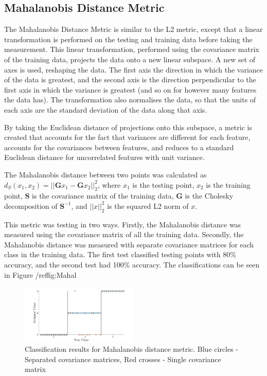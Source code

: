 \documentclass[10pt,twocolumn,letterpaper]{article}
\begin{document}
\subsection{Mahalanobis Distance Metric}

The Mahalanobis Distance Metric is similar to the L2 metric, except that a linear transformation is performed on the testing and training data before taking the measurement. This linear transformation, performed using the covariance matrix of the training data, projects the data onto a new linear subspace. A new set of axes is used, reshaping the data. The first axis the direction in which the variance of the data is greatest, and the second axis is the direction perpendicular to the first axis in which the variance is greatest (and so on for however many features the data has). The transformation also normalises the data, so that the units of each axis are the standard deviation of the data along that axis. 

By taking the Euclidean distance of projections onto this subspace, a metric is created that accounts for the fact that variances are different for each feature, accounts for the covariances between features, and reduces to a standard Euclidean distance for uncorrelated features with unit variance.

The Mahalanobis distance between two points was calculated as $d_S(x_1,x_2) = ||\mathbf{G}x_1 - \mathbf{G}x_2||^2_2$, where $x_1$ is the testing point, $x_2$ is the training point, $\mathbf{S}$ is the covariance matrix of the training data, $\mathbf{G}$ is the Cholesky decomposition of $\mathbf{S}^{-1}$, and $||x||^2_2$ is the squared L2 norm of $x$.

This metric was testing in two ways. Firstly, the Mahalanobis distance was measured using the covariance matrix of all the training data. Secondly, the Mahalanobis distance was measured with separate covariance matrices for each class in the training data. The first test classified testing points with 80\% accuracy, and the second test had 100\% accuracy. The classifications can be seen in Figure /ref{fig:Mahal}

\begin{figure}[H]
\centering
\includegraphics[width=0.5\textwidth]{../results/Q1Db_Success}
\caption{Classification results for Mahalanobis distance metric. Blue circles - Separated covariance matrices, Red crosses - Single covariance matrix
\label{fig:Mahal}}
\end{figure}
\end{document}
